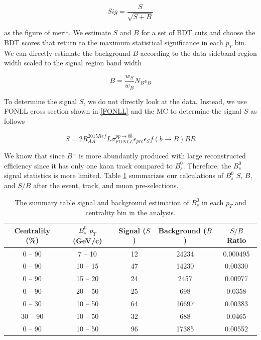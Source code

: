 \begin{equation}
Sig = \frac{S}{\sqrt{S+B}}
\end{equation}

as the figure of merit. We estimate $S$ and $B$ for a set of BDT cuts and choose the BDT scores that return to the maximum statistical significance in each $p_T$ bin. We can directly estimate the background $B$ according to the data sideband region width scaled to the signal region band width

\begin{equation}
B = \frac{w_{S}}{w_{B}} N_{B} \epsilon_{B}
\end{equation}

To determine the signal $S$, we do not directly look at the data. Instead, we use FONLL cross section \cite{FONLLCal} shown in \ref{FONLL} and the MC to determine the signal $S$ as follows

\begin{equation}
S = 2 R_{AA}^{2015Ref} L \sigma_{FONLL}^{pp\rightarrow b\bar b} \epsilon_{pre} \epsilon_{S} f(b\rightarrow B) BR
\end{equation}

We know that since $B^+$ is more abundantly produced with large reconstructed efficiency since it has only one kaon track compared to $B^0_s$. Therefore, the $B^0_s$ signal statistics is more limited. Table \ref{BsSBCal} summarizes our calculations of $B^0_s$ $S$, $B$, and $S/B$ after the event, track, and muon pre-selections.  


\begin{table}[h]
\begin{center}
\caption{The summary table signal and background estimation of $B^0_s$ in each $p_T$ and centrality bin in the analysis.}
\vspace{1em}
\label{BsSBCal}
  \begin{tabular}{ |c|c|c|c|c|}
    \hline 
Centrality (\%) & $B^0_s$ $p_T$ (GeV/c) & Signal ($S$) & Background ($B$) & $S/B$ Ratio \\
     \hline
0 -- 90 & 7 -- 10 & 12 & 24234 & 0.000495  \\
0 -- 90 & 10 -- 15 & 47 &14230  & 0.00330 \\
0 -- 90 & 15 -- 20 &24 & 2457 & 0.00977 \\
0 -- 90 & 20 -- 50 & 25 & 698 & 0.0358 \\
0 -- 30 & 10 -- 50 & 64 &  16697 & 0.00383 \\
30 -- 90 & 10 -- 50 &32 & 688 & 0.0465 \\
0 -- 90 & 10 -- 50 & 96 &17385  &  0.00552\\
     \hline
    \hline
\end{tabular}
\end{center}
\end{table}



